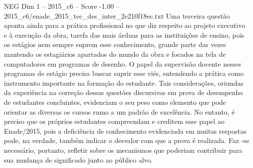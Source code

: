 \begin{textsample}{NEG Dim 1 – 2015\_c6 – Score -1.00 – 2015\_c6/enade\_2015\_tec\_des\_inter\_2e210f18ec.txt}
Uma terceira questão aponta ainda para a prática profissional no que diz respeito ao projeto executivo e à execução da obra, tarefa das mais árduas para as instituições de ensino, pois os estágios nem sempre suprem esse conhecimento, grande parte das vezes mantendo os estagiários apartados do mundo da obra e focados na tela de computadores em programas de desenho.
O papel da supervisão docente nesses programas de estágio precisa buscar suprir esse viés, entendendo a prática como instrumento importante na formação do estudante.
Tais considerações, oriundas da experiência na correção dessas questões discursivas em prova de desempenho de estudantes concluintes, evidenciam o seu peso como elemento que pode orientar as diversas os cursos rumo a um padrão de excelência.
No entanto, é preciso que os próprios estudantes compreendam e creditem esse papel ao Enade/2015, pois a deficiência de conhecimento evidenciada em muitas respostas pode, na verdade, também indicar o desvalor com que a prova é realizada.
Faz -se necessário, portanto, refletir sobre os mecanismos que poderiam contribuir para sua mudança de significado junto ao público alvo.

\end{textsample}
